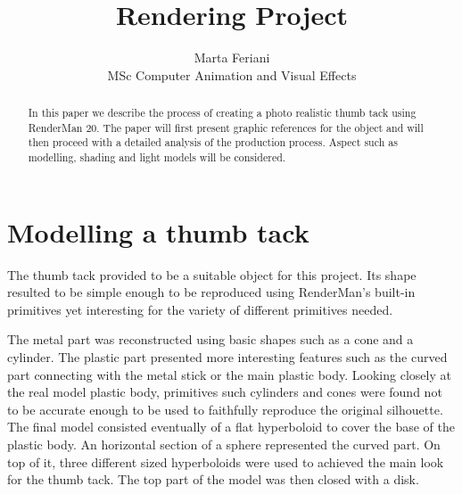 \documentclass[tog]{acmsiggraph}
\title{Rendering Project}
\author{Marta Feriani\\MSc Computer Animation and Visual Effects}
\begin{document}


\maketitle

\begin{abstract}

In this paper we describe the process of creating a photo realistic thumb tack using RenderMan 20. The paper will first present graphic references for the object and will then proceed with a detailed analysis of the production process.
Aspect such as modelling, shading and light models will be considered.

\end{abstract}

\keywordlist


\copyrightspace



\section{Modelling a thumb tack}

The thumb tack provided to be a suitable object for this project. Its shape resulted to be simple enough to be reproduced using RenderMan's built-in primitives yet interesting for the variety of different primitives needed.

The metal part was reconstructed using basic shapes such as a cone and a cylinder.
The plastic part presented more interesting features such as the curved part connecting with the metal stick or the main plastic body. Looking closely at the real model plastic body, primitives such cylinders and cones were found not to be accurate enough to be used to faithfully reproduce the original silhouette.
The final model consisted eventually of a flat hyperboloid to cover the base of the plastic body. An horizontal section of a sphere represented the curved part. On top of it, three different sized hyperboloids were used to achieved the main look for the thumb tack. The top part of the model was then closed with a disk.
\end{document}
